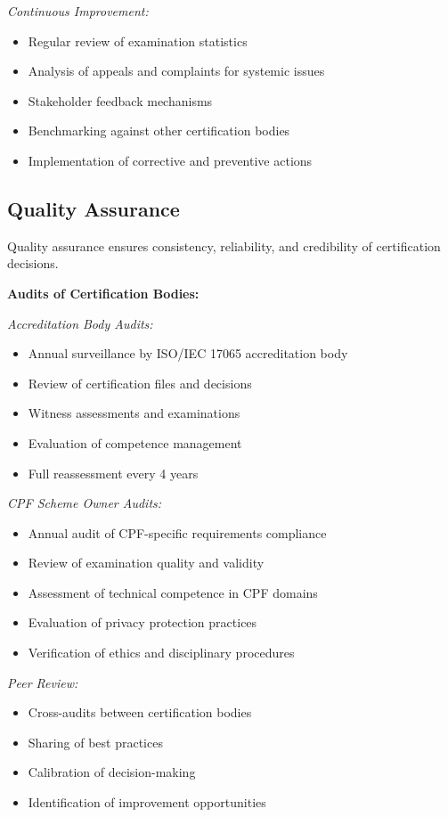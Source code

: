 \documentclass[11pt,a4paper]{article}
\begin{document}
\textit{Continuous Improvement:}
\begin{itemize}
\item Regular review of examination statistics
\item Analysis of appeals and complaints for systemic issues
\item Stakeholder feedback mechanisms
\item Benchmarking against other certification bodies
\item Implementation of corrective and preventive actions
\end{itemize}

\subsection{Quality Assurance}

Quality assurance ensures consistency, reliability, and credibility of certification decisions.

\textbf{Audits of Certification Bodies:}

\textit{Accreditation Body Audits:}
\begin{itemize}
\item Annual surveillance by ISO/IEC 17065 accreditation body
\item Review of certification files and decisions
\item Witness assessments and examinations
\item Evaluation of competence management
\item Full reassessment every 4 years
\end{itemize}

\textit{CPF Scheme Owner Audits:}
\begin{itemize}
\item Annual audit of CPF-specific requirements compliance
\item Review of examination quality and validity
\item Assessment of technical competence in CPF domains
\item Evaluation of privacy protection practices
\item Verification of ethics and disciplinary procedures
\end{itemize}

\textit{Peer Review:}
\begin{itemize}
\item Cross-audits between certification bodies
\item Sharing of best practices
\item Calibration of decision-making
\item Identification of improvement opportunities
\end{itemize}
\end{document}
